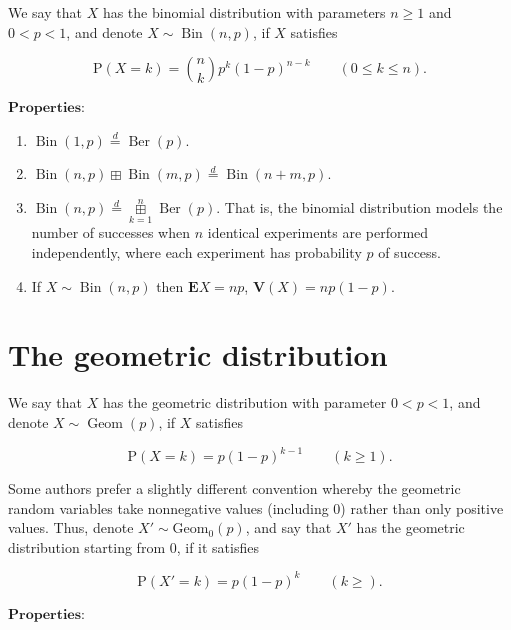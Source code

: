 \documentclass[11pt]{report}
\theoremstyle{plain}
\theoremstyle{definition}
\begin{document}
We say that $X$ has the binomial distribution with
parameters $n\ge 1$ and $0<p<1$, and denote
$X\sim \operatorname{Bin}(n,p)$, if $X$ satisfies

\[
\mathrm{P}(X = k) = \binom{n}{k} p^k (1-p)^{n-k} \qquad (0\le k\le n).
\]

\noindent $\textbf{Properties:}$

\begin{enumerate}[label=\arabic*.]
\item $\operatorname{Bin}(1,p) \stackrel{d}{=}
\operatorname{Ber}(p)$.

\item $\operatorname{Bin}(n,p) \boxplus
\operatorname{Bin}(m,p) \stackrel{d}{=}
\operatorname{Bin}(n+m,p)$.

\item $\operatorname{Bin}(n,p) \stackrel{d}{=}
\mathop{\boxplus}\limits_{k=1}^n
\operatorname{Ber}(p)$.
That is, the binomial distribution models the number
of successes when $n$ identical experiments are
performed independently, where each experiment has
probability $p$ of success.

\item If $X\sim \operatorname{Bin}(n,p)$ then
$\mathbf{E} X = np$, $\mathbf{V}(X) = np(1-p)$.
\end{enumerate}

\section{The geometric distribution}

We say that $X$ has the geometric distribution with
parameter $0<p<1$, and denote
$X\sim \operatorname{Geom}(p)$, if $X$ satisfies

\[
\mathrm{P}(X=k) = p(1-p)^{k-1} \qquad (k \ge 1).
\]

\noindent Some authors prefer a slightly different convention
whereby the geometric random variables take
nonnegative values (including $0$) rather than only
positive values. Thus, denote
$X' \sim \operatorname{Geom_0}(p)$, and say that $X'$
has the geometric distribution starting from $0$, if
it satisfies

\[
\mathrm{P}(X'=k) = p(1-p)^{k} \qquad (k \ge ).
\]

\noindent $\textbf{Properties:}$
\end{document}
